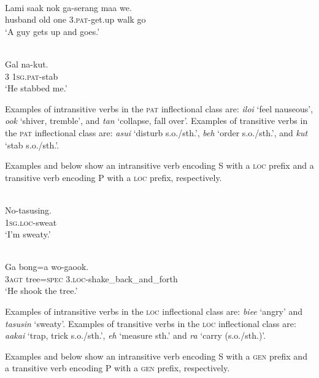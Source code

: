 \ea%
\label{bkm:Ref324337569}
 \\ 
\gll    Lami  saak  nok  ga-serang  maa  we.\\  
    husband  old  one  3.\textsc{pat}{}-get.up  walk  go  \\
\glt  `A guy gets up and goes.'
\z


\ea%
\label{bkm:Ref324338165}
 \\ 
\gll   Gal  na-kut.     \\  
   3  1\textsc{sg.pat-}stab     \\
\glt `He stabbed me.'
\z

Examples of intransitive verbs in the \textsc{pat} inflectional class are: \textit{iloi} `feel nauseous', \textit{ook} `shiver, tremble', and \textit{tan} `collapse, fall over'. Examples of transitive verbs in the \textsc{pat} inflectional class are: \textit{asui} `disturb s.o./sth.', \textit{beh} `order s.o./sth.', and \textit{kut} `stab s.o./sth.'.

Examples  and  below show an intransitive verb encoding S with a \textsc{loc} prefix and a transitive verb encoding P with a \textsc{loc} prefix, respectively.


\ea%
\label{bkm:Ref324338359}
 \\ 
\gll    No-tasusing.   \\  
    \textsc{1sg.loc}{}-sweat   \\
\glt  `I'm sweaty.'
\z


\ea 
\label{ex:1238}
 \\ 
 \gll    Ga  bong=a  wo-gaook.  \\
 \textsc{3agt} tree=\textsc{spec} 3.\textsc{loc}{}-shake\_back\_and\_forth     \\
 \glt  `He shook the tree.'
\z



Examples of intransitive verbs in the \textsc{loc} inflectional class are: \textit{biee} `angry' and \textit{tasusin} `sweaty'. Examples of transitive verbs in the \textsc{loc} inflectional class are: \textit{aakai} `trap, trick s.o./sth.', \textit{eh} `measure sth.' and \textit{ra} `carry (s.o./sth.)'.

Examples  and  below show an intransitive verb encoding S with a \textsc{gen} prefix and a transitive verb encoding P with a \textsc{gen} prefix, respectively.


